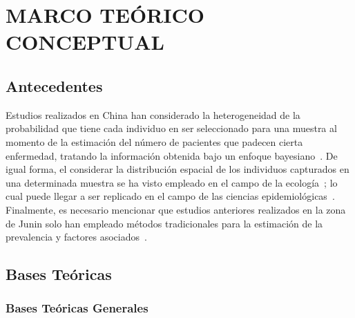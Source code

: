 \chapter{MARCO TEÓRICO CONCEPTUAL}
\section{Antecedentes}
Estudios realizados en China han considerado la heterogeneidad de la probabilidad que tiene cada individuo en ser seleccionado para una muestra al momento de la estimación del número de pacientes que padecen cierta enfermedad, tratando la información obtenida bajo un enfoque bayesiano~\cite{bailly2015bayesian}. De igual forma, el considerar la distribución espacial de los individuos capturados en una determinada muestra se ha visto empleado en el campo de la ecología~\cite{Royle2014Spatial}; lo cual puede llegar a ser replicado en el campo de las ciencias epidemiológicas~\cite{braeye2016capture}. Finalmente, es necesario mencionar que estudios anteriores realizados en la zona de Junin solo han empleado métodos tradicionales para la estimación de la prevalencia y factores asociados~\cite{santivanez2010factores}.
\section{Bases Teóricas}
\subsection{Bases Teóricas Generales}

